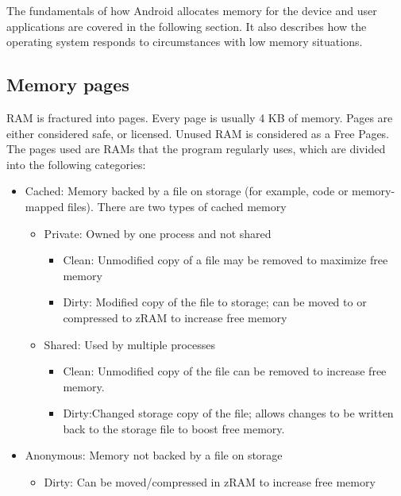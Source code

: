 \documentclass[preprint,12pt]{elsarticle}
\begin{document}
The fundamentals of how Android allocates memory for the device and user applications are covered in the following section. It also describes how the operating system responds to circumstances with low memory situations.

\subsection{Memory pages}  
RAM is fractured into pages. Every page is usually 4 KB of memory. 
Pages are either considered safe, or licensed. Unused RAM is considered as a Free Pages. The pages used are RAMs that the program regularly uses, which are divided into the following categories:
\begin{itemize}
	\item Cached: Memory backed by a file on storage (for example, code or memory-mapped files). There are two types of cached memory
	
	\begin{itemize}
    	\item Private: Owned by one process and not shared    
    	
    	\begin{itemize}
    	\item Clean: Unmodified copy of a file may be removed to maximize free memory

        \item Dirty: Modified copy of the file to storage; can be moved to or compressed to zRAM to increase free memory

    \end{itemize}
        
    \end{itemize}
	
    
    \begin{itemize}
    \item Shared: Used by multiple processes

     \begin{itemize}
    	\item Clean: Unmodified copy of the file can be removed to increase free memory.

        \item Dirty:Changed storage copy of the file; allows changes to be written back to the storage file to boost free memory.
        \end{itemize}
    \end{itemize}
    
    \item Anonymous: Memory not backed by a file on storage
     \begin{itemize}
    	\item Dirty: Can be moved/compressed in zRAM to increase free memory
       
    \end{itemize}
\end{itemize}
\end{document}
